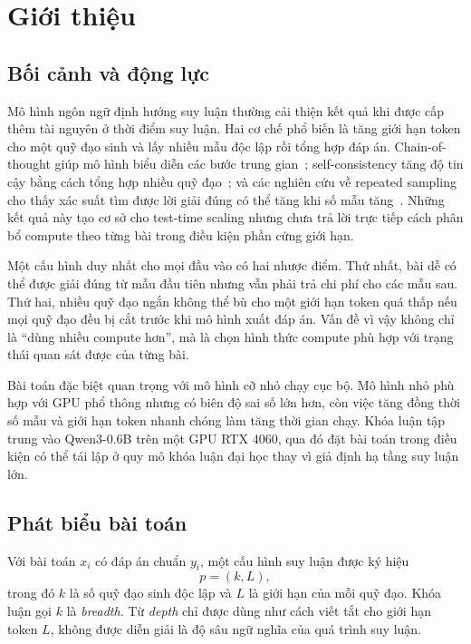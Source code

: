 \chapter{Giới thiệu}
\label{chap:introduction}

\section{Bối cảnh và động lực}

Mô hình ngôn ngữ định hướng suy luận thường cải thiện kết quả khi được cấp thêm
tài nguyên ở thời điểm suy luận. Hai cơ chế phổ biến là tăng giới hạn token cho
một quỹ đạo sinh và lấy nhiều mẫu độc lập rồi tổng hợp đáp án. Chain-of-thought
giúp mô hình biểu diễn các bước trung gian~\cite{wei2022cot}; self-consistency
tăng độ tin cậy bằng cách tổng hợp nhiều quỹ đạo~\cite{wang2023selfconsistency};
và các nghiên cứu về repeated sampling cho thấy xác suất tìm được lời giải đúng
có thể tăng khi số mẫu tăng~\cite{brown2024monkeys}. Những kết quả này tạo cơ
sở cho test-time scaling nhưng chưa trả lời trực tiếp cách phân bổ compute theo
từng bài trong điều kiện phần cứng giới hạn.

Một cấu hình duy nhất cho mọi đầu vào có hai nhược điểm. Thứ nhất, bài dễ có thể
được giải đúng từ mẫu đầu tiên nhưng vẫn phải trả chi phí cho các mẫu sau. Thứ
hai, nhiều quỹ đạo ngắn không thể bù cho một giới hạn token quá thấp nếu mọi
quỹ đạo đều bị cắt trước khi mô hình xuất đáp án. Vấn đề vì vậy không chỉ là
``dùng nhiều compute hơn'', mà là chọn hình thức compute phù hợp với trạng thái
quan sát được của từng bài.

Bài toán đặc biệt quan trọng với mô hình cỡ nhỏ chạy cục bộ. Mô hình nhỏ phù hợp
với GPU phổ thông nhưng có biên độ sai số lớn hơn, còn việc tăng đồng thời số
mẫu và giới hạn token nhanh chóng làm tăng thời gian chạy. Khóa luận tập trung
vào Qwen3-0.6B trên một GPU RTX 4060, qua đó đặt bài toán trong điều kiện có thể
tái lập ở quy mô khóa luận đại học thay vì giả định hạ tầng suy luận lớn.

\section{Phát biểu bài toán}

Với bài toán $x_i$ có đáp án chuẩn $y_i$, một cấu hình suy luận được ký hiệu
\begin{equation}
  p=(k,L),
\end{equation}
trong đó $k$ là số quỹ đạo sinh độc lập và $L$ là giới hạn
 của mỗi quỹ đạo. Khóa luận gọi $k$ là \emph{breadth}.
Từ \emph{depth} chỉ được dùng như cách viết tắt cho giới hạn token $L$, không
được diễn giải là độ sâu ngữ nghĩa của quá trình suy luận.

